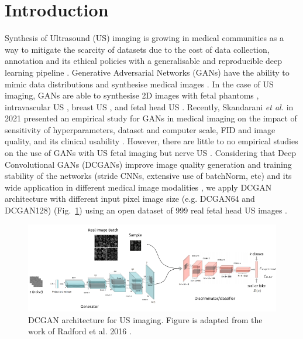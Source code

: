 \documentclass[runningheads]{llncs}
\begin{document}
\section{Introduction}
Synthesis of Ultrasound (US) imaging is growing in medical communities as a way to mitigate the scarcity of datasets due to the cost of data collection, annotation and its ethical policies with a generalisable and reproducible deep learning pipeline \cite{fiorentino2022-DLUSFetalImaging}.
Generative Adversarial Networks (GANs) have the ability to mimic data distributions and synthesise medical images \cite{KAZEMINIA2020gans, skandarani2021gans}.
In the case of US imaging, GANs are able to synthesise 2D images with fetal phantoms \cite{hu2017-gans-us}, intravascular US \cite{tom-gans-us}, breast US \cite{fujioka2019-gans-us}, and fetal head US \cite{lee2022-gans-us}.
Recently, Skandarani \textit{et al.} in 2021 presented an empirical study for GANs in medical imaging on the impact of sensitivity of hyperparameters, dataset and computer scale, FID and image quality, and its clinical usability \cite{skandarani2021gans}.
However, there are little to no empirical studies on the use of GANs with US fetal imaging but nerve US \cite{kumar2021empirical}.
Considering that Deep Convolutional GANs (DCGANs) improve image quality generation and training stability of the networks (stride CNNs, extensive use of batchNorm, etc) \cite{radford2016unsupervised} and its wide application in different medical image modalities \cite{radford2016unsupervised,KAZEMINIA2020gans, skandarani2021gans, fujioka2019-gans-us}, we apply DCGAN architecture \cite{radford2016unsupervised} with different input pixel image size (e.g. DCGAN64 and DCGAN128) (Fig.~\ref{fig1}) using an open dataset of 999 real fetal head US images \cite{vandenHeuvel2018}.

\begin{figure}
\includegraphics[width=\textwidth]{../figures/dcgan-based-network/versions/drawing-v01.png}%
\caption{DCGAN architecture for US imaging. Figure is adapted from the work of Radford et al. 2016 \cite{radford2016unsupervised}.} \label{fig1}
\end{figure}
\end{document}
